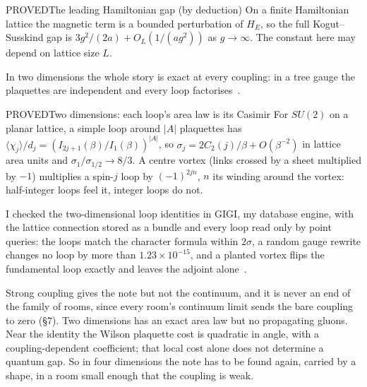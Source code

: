 \begin{claim}{PROVED}{The leading Hamiltonian gap (by deduction)}\label{b:kato}
On a finite Hamiltonian lattice the magnetic term is a bounded perturbation of $H_E$, so the full Kogut--Susskind gap is
$3g^2/(2a)+O_L(1/(ag^2))$ as $g\to\infty$. The constant here may depend on lattice size $L$.
\end{claim}

In two dimensions the whole story is exact at every coupling: in a tree gauge the plaquettes are independent and every
loop factorises~\cite{Migdal75,GrossWitten80}.

\begin{claim}{PROVED}{Two dimensions: each loop's area law is its Casimir}\label{b:2d}
For $SU(2)$ on a planar lattice, a simple loop around $|A|$ plaquettes has $\langle\chi_j\rangle/d_j=(I_{2j+1}(\beta)/
I_1(\beta))^{|A|}$, so $\sigma_j=2C_2(j)/\beta+O(\beta^{-2})$ in lattice area units and $\sigma_1/\sigma_{1/2}\to8/3$. A centre vortex (links
crossed by a sheet multiplied by $-1$) multiplies a spin-$j$ loop by $(-1)^{2jn}$, $n$ its winding around the vortex:
half-integer loops feel it, integer loops do not.
\end{claim}

I checked the two-dimensional loop identities in GIGI, my database engine, with the lattice connection stored as a bundle and every loop read
only by point queries: the loops match the character formula within $2\sigma$, a random gauge rewrite changes no loop by
more than $1.23\times10^{-15}$, and a planted vortex flips the fundamental loop exactly and leaves the adjoint
alone~\cite{HelikeReport}.

Strong coupling gives the note but not the continuum, and it is never an end of the family of rooms, since every
room's continuum limit sends the bare coupling to zero (\S7). Two dimensions has an exact area law but no propagating
gluons. Near the identity the Wilson plaquette cost is quadratic in angle, with a coupling-dependent coefficient;
that local cost alone does not determine a quantum gap. So in
four dimensions the note has to be found again, carried by a shape, in a room small enough that the coupling is weak.
